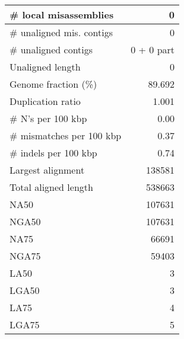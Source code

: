 \documentclass[12pt,a4paper]{article}
\begin{document}
\begin{table}[ht]
\begin{center}
\begin{tabular}{|l*{1}{|r}|}
\# local misassemblies & 0 \\ \hline
\# unaligned mis. contigs & 0 \\ \hline
\# unaligned contigs & 0 + 0 part \\ \hline
Unaligned length & 0 \\ \hline
Genome fraction (\%) & 89.692 \\ \hline
Duplication ratio & 1.001 \\ \hline
\# N's per 100 kbp & 0.00 \\ \hline
\# mismatches per 100 kbp & 0.37 \\ \hline
\# indels per 100 kbp & 0.74 \\ \hline
Largest alignment & 138581 \\ \hline
Total aligned length & 538663 \\ \hline
NA50 & 107631 \\ \hline
NGA50 & 107631 \\ \hline
NA75 & 66691 \\ \hline
NGA75 & 59403 \\ \hline
LA50 & 3 \\ \hline
LGA50 & 3 \\ \hline
LA75 & 4 \\ \hline
LGA75 & 5 \\ \hline
\end{tabular}
\end{center}
\end{table}
\end{document}
